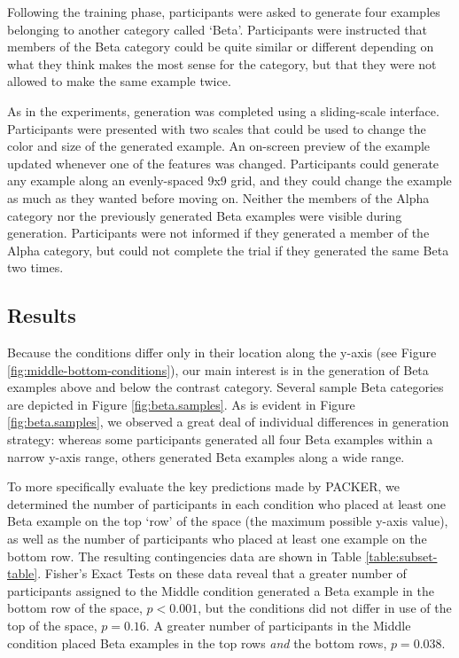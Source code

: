 \documentclass[10pt,letterpaper]{article}
\begin{document}
Following the training phase, participants were asked to generate four examples belonging to another category called `Beta'. Participants were instructed that members of the Beta category could be quite similar or different depending on what they think makes the most sense for the category, but that they were not allowed to make the same example twice. 

As in the \citet{jern2013probabilistic} experiments, generation was completed using a sliding-scale interface. Participants were presented with two scales that could be used to change the color and size of the generated example. An on-screen preview of the example updated whenever one of the features was changed. Participants could generate any example along an evenly-spaced 9x9 grid, and they could change the example as much as they wanted before moving on. Neither the members of the Alpha category nor the previously generated Beta examples were visible during generation. Participants were not informed if they generated a member of the Alpha category, but could not complete the trial if they generated the same Beta two times.


\subsection{Results}

Because the conditions differ only in their location along the y-axis (see Figure \ref{fig:middle-bottom-conditions}), our main interest is in the generation of Beta examples above and below the contrast category. Several sample Beta categories are depicted in Figure \ref{fig:beta.samples}. As is evident in Figure \ref{fig:beta.samples}, we observed a great deal of individual differences in generation strategy: whereas some participants generated all four Beta examples within a narrow y-axis range, others generated Beta examples along a wide range. 


To more specifically evaluate the key predictions made by PACKER, we determined the number of participants in each condition who placed at least one Beta example on the top `row' of the space (the maximum possible y-axis value), as well as the number of participants who placed at least one example on the bottom row. The resulting contingencies data are shown in Table \ref{table:subset-table}. Fisher's Exact Tests on these data reveal that a greater number of participants assigned to the Middle condition generated a Beta example in the bottom row of the space, $p < 0.001$, but the conditions did not differ in use of the top of the space, $p = 0.16$. A greater number of participants in the Middle condition placed Beta examples in the top rows \textit{and} the bottom rows, $p = 0.038$. 
\end{document}

